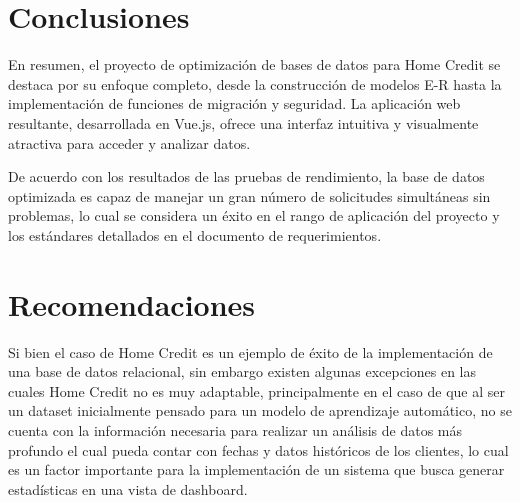 \section{Conclusiones}

En resumen, el proyecto de optimización de bases de datos para Home Credit se
destaca por su enfoque completo, desde la construcción de modelos E-R hasta la
implementación de funciones de migración y seguridad. La aplicación web
resultante, desarrollada en Vue.js, ofrece una interfaz intuitiva y visualmente
atractiva para acceder y analizar datos. 

De acuerdo con los resultados de las pruebas de rendimiento, la base de datos 
optimizada es capaz de manejar un gran número de solicitudes simultáneas sin 
problemas, lo cual se considera un éxito en el rango de aplicación del 
proyecto y los estándares detallados en el documento de requerimientos.

\section{Recomendaciones}

Si bien el caso de Home Credit es un ejemplo de éxito de la implementación de 
una base de datos relacional, sin embargo existen algunas excepciones en las 
cuales Home Credit no es muy adaptable, principalmente en el caso de 
que al ser un dataset inicialmente pensado para un modelo de aprendizaje 
automático, no se cuenta con la información necesaria para realizar un 
análisis de datos más profundo el cual pueda contar con fechas y datos 
históricos de los clientes, lo cual es un factor importante para la 
implementación de un sistema que busca generar estadísticas en una vista 
de dashboard.
